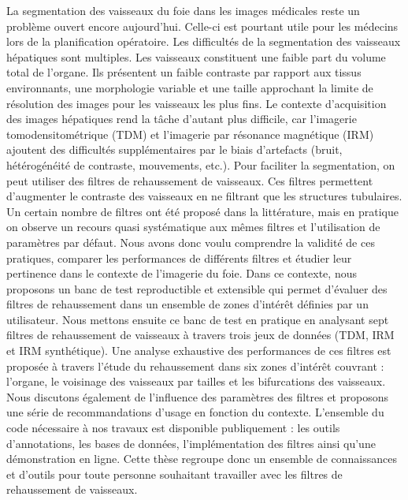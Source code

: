 %
\label{sec:abstract}


La segmentation des vaisseaux du foie dans les images médicales reste un problème ouvert encore aujourd'hui. Celle-ci est pourtant utile pour les médecins lors de la planification opératoire. Les difficultés de la segmentation des vaisseaux hépatiques sont multiples. Les vaisseaux constituent une faible part du volume total de l'organe. Ils présentent un faible contraste par rapport aux tissus environnants, une morphologie variable et une taille approchant la limite de résolution des images pour les vaisseaux les plus fins. Le contexte d'acquisition des images hépatiques rend la tâche d'autant plus difficile, car l'imagerie tomodensitométrique (TDM) et l'imagerie par résonance magnétique (IRM) ajoutent des difficultés supplémentaires par le biais d'artefacts (bruit, hétérogénéité de contraste, mouvements, etc.). Pour faciliter la segmentation, on peut utiliser des filtres de rehaussement de vaisseaux. Ces filtres permettent d'augmenter le contraste des vaisseaux en ne filtrant que les structures tubulaires. Un certain nombre de filtres ont été proposé dans la littérature, mais en pratique on observe un recours quasi systématique aux mêmes filtres et l'utilisation de paramètres par défaut. Nous avons donc voulu comprendre la validité de ces pratiques, comparer les performances de différents filtres et étudier leur pertinence dans le contexte de l'imagerie du foie. Dans ce contexte, nous proposons un banc de test reproductible et extensible qui permet d'évaluer des filtres de rehaussement dans un ensemble de zones d'intérêt définies par un utilisateur. Nous mettons ensuite ce banc de test en pratique en analysant sept filtres de rehaussement de vaisseaux à travers trois jeux de données (TDM, IRM et IRM synthétique). Une analyse exhaustive des performances de ces filtres est proposée à travers l'étude du rehaussement dans six zones d'intérêt couvrant : l'organe, le voisinage des vaisseaux par tailles et les bifurcations des vaisseaux. Nous discutons également de l'influence des paramètres des filtres et proposons une série de recommandations d'usage en fonction du contexte. L'ensemble du code nécessaire à nos travaux est disponible publiquement : les outils d'annotations, les bases de données, l'implémentation des filtres ainsi qu'une démonstration en ligne. Cette thèse regroupe donc un ensemble de connaissances et d'outils pour toute personne souhaitant travailler avec les filtres de rehaussement de vaisseaux.

